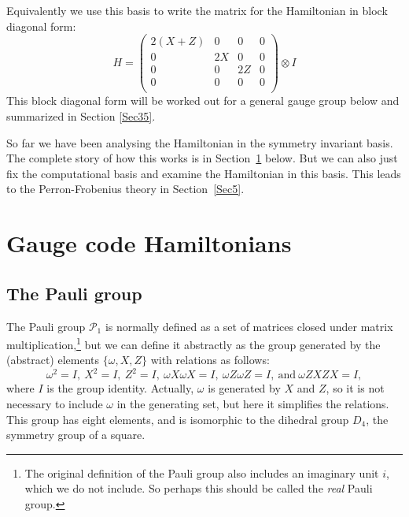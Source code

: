 \documentclass[a4paper,onecolumn,11pt,unpublished]{quantumarticle}
\newcommand{\todo}[1]{\ \textcolor{red}{\{#1\}}\ }
\newcommand{\Sref}[1]{Section~\ref{#1}}
\def\Ham{H}
\def\Pauli{\mathcal{P}}
\newcommand\tombstone{\qedsymbol\vskip 5pt}
\begin{document}
Equivalently we use this basis to 
write the matrix for the Hamiltonian in
block diagonal form:
$$
\Ham = 
\left( \begin{array}{cccc}
2(X+Z) & 0 & 0 & 0 \\
0  & 2X & 0 & 0 \\
0  & 0 & 2Z & 0 \\
0  & 0 & 0 & 0 \\
\end{array} \right) \otimes I
$$
This block diagonal form will be worked out for
a general gauge group below and summarized in Section \ref{Sec35}.
\tombstone

So far we have been analysing the Hamiltonian in the
symmetry invariant basis. The complete story of how this
works is in \Sref{Sec3} below.
But we can also just fix the computational basis and
examine the Hamiltonian in this basis.
This leads to the Perron-Frobenius theory in \Sref{Sec5}.


\section{Gauge code Hamiltonians}\label{Sec3}

\subsection{The Pauli group}\label{Sec31}

The Pauli group $\Pauli_1$ is normally 
defined as a set of matrices closed under
matrix multiplication,\footnote{The original definition of the Pauli
group also includes an imaginary unit $i$, which we
do not include. So perhaps this should be called the
\emph{real} Pauli group.}
but we can define it abstractly
as the group generated
by the (abstract) elements $\{\omega, X, Z\}$ with
relations as follows:
$$
\omega^2=I,\ X^2=I,\ Z^2=I,\ \omega X\omega X=I,\ \omega Z\omega Z=I,\ \mbox{and}\  \omega ZXZX=I,
$$
where $I$ is the group identity.
Actually, $\omega $ is generated by $X$ and $Z$,
so it is not necessary to include $\omega $ in the generating set,
but here it simplifies the relations.
This group has eight elements, and is isomorphic to the dihedral group $D_4$,
the symmetry group of a square.
\end{document}
